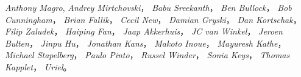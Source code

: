 \emph{Anthony Magro},
\emph{Andrey Mirtchovski}，
\emph{Babu Sreekanth}，
\emph{Ben Bullock}，
\emph{Bob Cunningham}，
\emph{Brian Fallik}，
\emph{Cecil New}，
\emph{Damian Gryski}，
\emph{Dan Kortschak}，
\emph{Filip Zaludek}，
\emph{Haiping Fan}，
\emph{Jaap Akkerhuis}，
\emph{JC van Winkel}，
\emph{Jeroen Bulten}，
\emph{Jinpu Hu}，
\emph{Jonathan Kans}，
\emph{Makoto Inoue}，
\emph{Mayuresh Kathe}，
\emph{Michael Stapelberg}，
\emph{Paulo Pinto}，
\emph{Russel Winder}，
\emph{Sonia Keys}，
\emph{Thomas Kapplet}，
\emph{Uriel}。

